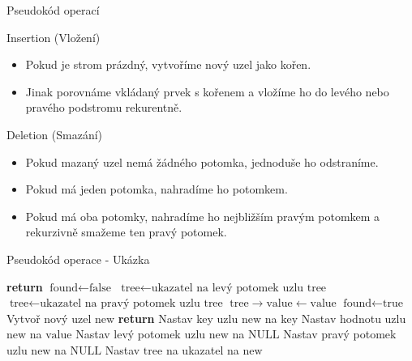 \documentclass{beamer}
\begin{document}
\begin{frame}{Pseudokód operací}
    \begin{block}{Insertion (Vložení)}
        \begin{itemize}
            \item Pokud je strom prázdný, vytvoříme nový uzel jako kořen.
            \item Jinak porovnáme vkládaný prvek s kořenem a vložíme ho do levého nebo pravého podstromu rekurentně.
        \end{itemize}
        \end{block}

    \begin{block}{Deletion (Smazání)}
        \begin{itemize}
            \item Pokud mazaný uzel nemá žádného potomka, jednoduše ho odstraníme.
            \item Pokud má jeden potomka, nahradíme ho potomkem.
            \item Pokud má oba potomky, nahradíme ho nejbližším pravým potomkem a rekurzivně smažeme ten pravý potomek.
        \end{itemize}
    \end{block}
\end{frame}


\begin{frame}[fragile]{Pseudokód operace - Ukázka}
    \begin{algorithm}[H]
    \caption{Vložení iterativně}\label{alg:bst_insert}
    \tiny
    \begin{algorithmic}[1]
            \State \textbf{return}
        \EndIf
        \State $\text{found} \gets \text{false}$
                \State $\text{tree} \gets \text{ukazatel na levý potomek uzlu tree}$
                \State $\text{tree} \gets \text{ukazatel na pravý potomek uzlu tree}$
            \Else
                \State $\text{tree}\rightarrow\text{value} \gets \text{value}$
                \State $\text{found} \gets \text{true}$
            \EndIf
        \EndWhile
            \State Vytvoř nový uzel $\text{new}$
                \State \textbf{return}
            \EndIf
            \State Nastav key uzlu $\text{new}$ na $\text{key}$
            \State Nastav hodnotu uzlu $\text{new}$ na $\text{value}$
            \State Nastav levý potomek uzlu $\text{new}$ na $\text{NULL}$
            \State Nastav pravý potomek uzlu $\text{new}$ na $\text{NULL}$
            \State Nastav $\text{tree}$ na ukazatel na $\text{new}$
        \EndIf
    \EndProcedure
    \end{algorithmic}
    \end{algorithm}
\end{frame}
\end{document}
